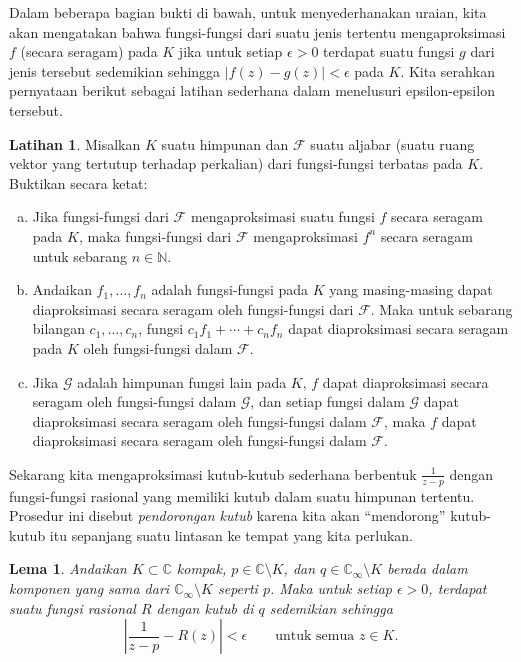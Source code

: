 \documentclass[12pt,openany]{book}
\newcommand{\sabs}[1]{\lvert {#1} \rvert}
\newcommand{\abs}[1]{\left\lvert {#1} \right\rvert}
\newcommand{\C}{{\mathbb{C}}}
\newcommand{\N}{{\mathbb{N}}}
\newcommand{\sF}{{\mathscr{F}}}
\newcommand{\sG}{{\mathscr{G}}}
\newcommand{\myindex}[1]{#1\index{#1}}
\newcommand{\myquote}[1]{``#1''}
\theoremstyle{plain}
\newtheorem{lemma}[thm]{Lema}
\theoremstyle{remark}
\theoremstyle{definition}
\newenvironment{exbox}{%
    \def\FrameCommand{\vrule width 1pt \relax\hspace{10pt}}%
    \MakeFramed{\advance\hsize-\width\FrameRestore}%
}{%
    \endMakeFramed
}
\newenvironment{exparts}{%
    \leavevmode\begin{enumerate}[a),noitemsep,topsep=0pt,parsep=0pt,partopsep=0pt]
}{%
    \end{enumerate}
}
\theoremstyle{exercise}
\newtheorem{exercise}{Latihan}[section]
\theoremstyle{example}
\begin{document}
Dalam beberapa bagian bukti di bawah, untuk menyederhanakan uraian, kita akan mengatakan bahwa
fungsi-fungsi dari suatu jenis tertentu mengaproksimasi $f$ (secara seragam) pada $K$
jika untuk setiap $\epsilon > 0$ terdapat suatu fungsi $g$
dari jenis tersebut sedemikian sehingga
$\sabs{f(z)-g(z)} < \epsilon$ pada $K$.  Kita serahkan pernyataan berikut sebagai
latihan sederhana dalam menelusuri epsilon-epsilon tersebut.

\begin{exbox}
\begin{exercise} \label{exercise:approxbyfamily}
Misalkan $K$ suatu himpunan dan $\sF$ suatu aljabar (suatu ruang vektor
yang tertutup terhadap perkalian) dari fungsi-fungsi terbatas pada $K$.  Buktikan secara ketat:
\begin{exparts}
\item
Jika fungsi-fungsi dari $\sF$ mengaproksimasi suatu fungsi $f$ secara seragam pada $K$,
maka fungsi-fungsi dari $\sF$ mengaproksimasi $f^n$ secara seragam untuk sebarang $n \in \N$.
\item
Andaikan
$f_1,\ldots,f_n$ adalah fungsi-fungsi pada $K$ yang masing-masing dapat
diaproksimasi secara seragam
oleh fungsi-fungsi dari $\sF$.  Maka untuk sebarang bilangan $c_1,\ldots,c_n$, fungsi
$c_1 f_1 + \cdots + c_n f_n$ dapat diaproksimasi secara seragam pada $K$
oleh fungsi-fungsi dalam $\sF$.
\item
Jika $\sG$ adalah himpunan fungsi lain pada $K$,
$f$ dapat diaproksimasi secara seragam oleh fungsi-fungsi dalam $\sG$,
dan setiap fungsi dalam $\sG$ dapat diaproksimasi secara seragam oleh fungsi-fungsi dalam
$\sF$, maka $f$ dapat diaproksimasi secara seragam oleh fungsi-fungsi dalam $\sF$.
\end{exparts}
\end{exercise}
\end{exbox}

Sekarang kita mengaproksimasi kutub-kutub sederhana berbentuk $\frac{1}{z-p}$ dengan fungsi-fungsi
rasional yang memiliki kutub dalam suatu himpunan tertentu.  Prosedur ini disebut
\emph{\myindex{pendorongan kutub}} karena kita akan \myquote{mendorong} kutub-kutub itu sepanjang suatu
lintasan ke tempat yang kita perlukan.

\begin{lemma} \label{lemma:polepushing}
Andaikan $K \subset \C$ kompak,
$p \in \C \setminus K$, dan
$q \in \C_{\infty} \setminus K$
berada dalam komponen yang sama dari $\C_{\infty} \setminus K$ seperti $p$.
Maka untuk setiap $\epsilon > 0$,
terdapat suatu fungsi rasional $R$ dengan kutub di $q$ sedemikian sehingga
\begin{equation*}
\abs{\frac{1}{z-p}-R(z)} < \epsilon \qquad \text{untuk semua $z \in K$.}
\end{equation*}
\end{lemma}
\end{document}
